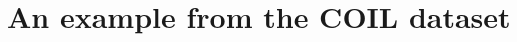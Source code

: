 %    
    
    
    
  
    
  \section{An example from the COIL dataset} \label{sec:chap6_coildata}


